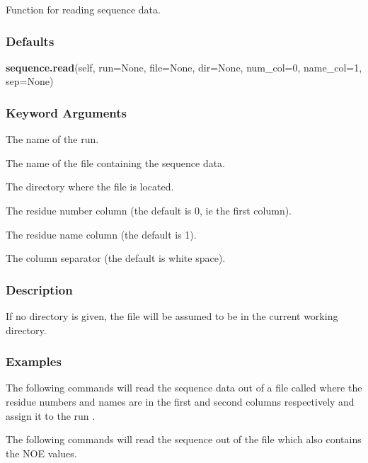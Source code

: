Function for reading sequence data.

\subsubsection{Defaults}

\textsf{\textbf{sequence.read}(self, run=None, file=None, dir=None, num\_col=0, name\_col=1, sep=None)}


\subsubsection{Keyword Arguments}


  The name of the run.

  The name of the file containing the sequence data.

  The directory where the file is located.

  The residue number column (the default is 0, ie the first column).

  The residue name column (the default is 1).

  The column separator (the default is white space).

\subsubsection{Description}

If no directory is given, the file will be assumed to be in the current working directory.


\subsubsection{Examples}

The following commands will read the sequence data out of a file called 
 where the
residue numbers and names are in the first and second columns respectively and assign it to
the run 
.






The following commands will read the sequence out of the file 
 which also contains
the NOE values.

